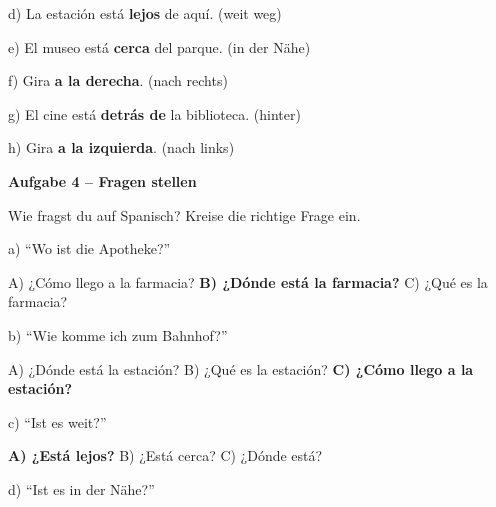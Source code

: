 \documentclass[11pt, a4paper]{article}
\newcommand{\fachfarbe}{spanisch}
\newcommand{\punktebox}[1]{\hfill\fbox{\small \_\_\_/#1}}
\newcommand{\lsg}[1]{\textcolor{loesung}{\textbf{#1}}}
\newenvironment{aufgabe}[1]{%
    \needspace{5\baselineskip}%
    \nopagebreak[4]%
    \vspace{10pt}
    \noindent\textbf{\textcolor{\fachfarbe}{Aufgabe #1}}
    \nopagebreak[4]%
    \vspace{5pt}
    \nopagebreak[4]%
    \begin{list}{}{\leftmargin=0pt}
    \item[]
}{%
    \end{list}
}
\begin{document}
\vspace{0.8em}

\noindent
d) La estación está \lsg{lejos} de aquí. (weit weg)

\vspace{0.8em}

\noindent
e) El museo está \lsg{cerca} del parque. (in der Nähe)

\vspace{0.8em}

\noindent
f) Gira \lsg{a la derecha}. (nach rechts)

\vspace{0.8em}

\noindent
g) El cine está \lsg{detrás de} la biblioteca. (hinter)

\vspace{0.8em}

\noindent
h) Gira \lsg{a la izquierda}. (nach links)

\vspace{15pt}


\begin{aufgabe}{4 -- Fragen stellen}
Wie fragst du auf Spanisch? Kreise die richtige Frage ein. \punktebox{6}
\end{aufgabe}

\noindent
a) ``Wo ist die Apotheke?''

\hspace{1cm} A) ¿Cómo llego a la farmacia? \quad \lsg{B) ¿Dónde está la farmacia?} \quad C) ¿Qué es la farmacia?

\vspace{0.8em}

\noindent
b) ``Wie komme ich zum Bahnhof?''

\hspace{1cm} A) ¿Dónde está la estación? \quad B) ¿Qué es la estación? \quad \lsg{C) ¿Cómo llego a la estación?}

\vspace{0.8em}

\noindent
c) ``Ist es weit?''

\hspace{1cm} \lsg{A) ¿Está lejos?} \quad B) ¿Está cerca? \quad C) ¿Dónde está?

\vspace{0.8em}

\noindent
d) ``Ist es in der Nähe?''
\end{document}
